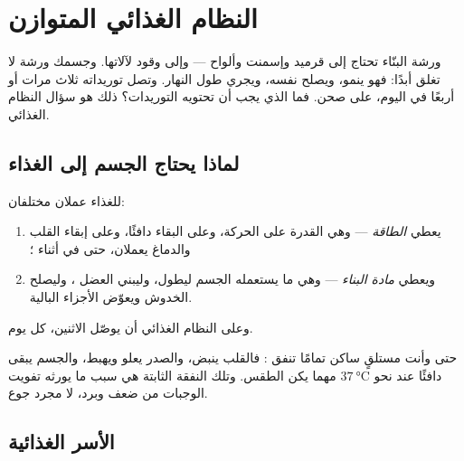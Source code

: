 \chapter{النظام الغذائي المتوازن}\label{ch:g3:balanced-diet}

ورشة البنّاء تحتاج إلى قرميد وإسمنت وألواح --- وإلى وقود
لآلاتها. وجسمك ورشة لا تغلق أبدًا: فهو ينمو، ويصلح نفسه، ويجري
طول النهار. وتصل توريداته ثلاث مرات أو أربعًا في اليوم، على صحن.
فما الذي يجب أن تحتويه التوريدات؟ ذلك هو سؤال النظام الغذائي.

\section{لماذا يحتاج الجسم إلى الغذاء}

\begin{proposition}\label{prop:g3:balanced-diet:jobs}
للغذاء عملان مختلفان:
\begin{enumerate}
  \item يعطي \emph{الطاقة} --- وهي القدرة
        على الحركة، وعلى البقاء دافئًا، وعلى إبقاء القلب والدماغ
        يعملان، حتى في أثناء ؛
  \item ويعطي \emph{مادة البناء} --- وهي ما يستعمله الجسم ليطول،
        وليبني العضل ، وليصلح الخدوش ويعوّض الأجزاء
        البالية.
\end{enumerate}
وعلى النظام الغذائي أن يوصّل الاثنين، كل يوم.
\end{proposition}
\admitted

\begin{example}\label{ex:g3:balanced-diet:rest}
حتى وأنت مستلقٍ ساكن تمامًا تنفق : فالقلب ينبض، والصدر يعلو
ويهبط، والجسم يبقى دافئًا عند نحو
$\qty{37}{\degreeCelsius}$ مهما يكن الطقس. وتلك النفقة الثابتة
هي سبب ما يورثه تفويت الوجبات من ضعف وبرد، لا مجرد جوع.
\end{example}

\section{الأسر الغذائية}

